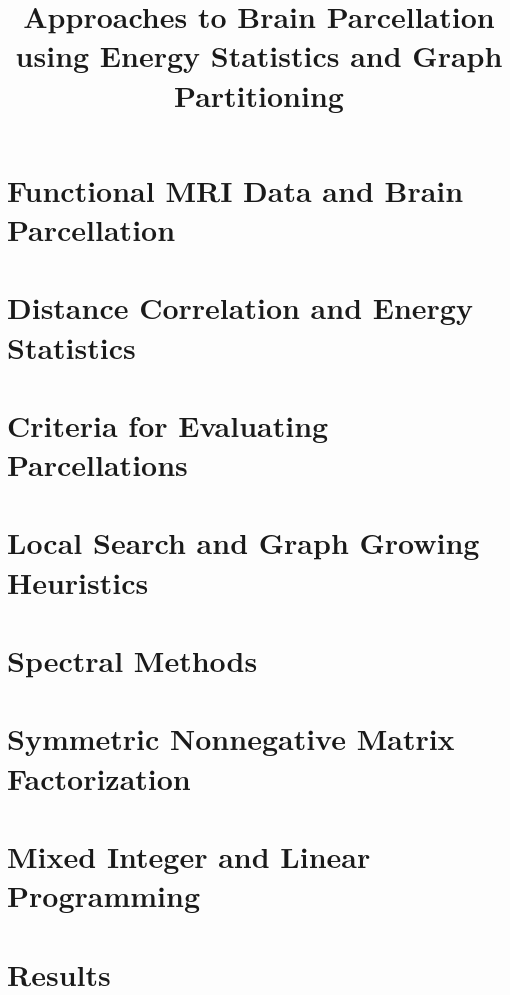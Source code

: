 \documentclass[12pt,lot,lof]{report}
\title{Approaches to Brain Parcellation using Energy Statistics and Graph Partitioning}
\begin{document}
\chapter{Functional MRI Data and Brain Parcellation}


\chapter{Distance Correlation and Energy Statistics}


\chapter{Criteria for Evaluating Parcellations}


\chapter{Local Search and Graph Growing Heuristics}


\chapter{Spectral Methods}


\chapter{Symmetric Nonnegative Matrix Factorization}


\chapter{Mixed Integer and Linear Programming}


\chapter{Results}




\end{document}
